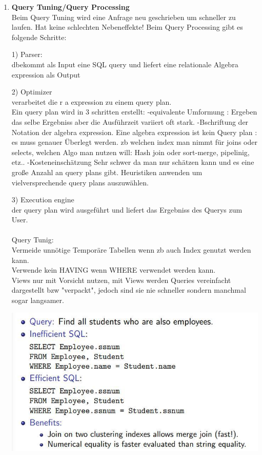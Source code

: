 \documentclass[12pt]{article}\pagestyle{myheadings}
\theoremstyle{plain}
\begin{document}
\begin{enumerate}
\item \textbf{Query Tuning/Query Processing} \\
Beim Query Tuning wird eine Anfrage neu geschrieben um schneller zu laufen.
Hat keine schlechten Nebeneffekte!
Beim Query Processing gibt es folgende Schritte:
\item[1)]Parser:\\
dbekommt als Input eine SQL query und liefert eine relationale Algebra expression als Output\\
\item[2)]Optimizer\\
verarbeitet die r a expression zu einem query plan.
\\
Ein query plan wird in 3 schritten erstellt:
-equivalente Umformung : Ergeben das selbe Ergebniss aber die Ausführzeit variiert oft stark.
-Bschriftung der Notation der algebra expression. Eine algebra expression ist kein Query plan : es muss genauer Überlegt werden. zb welchen index man nimmt für joins oder selects, welchen Algo man nutzen will: Hash join oder sort-merge, pipelinig, etz..
-Kosteneinschätzung
Sehr schwer da man nur schätzen kann und es eine große Anzahl an query plans gibt.
Heuristiken anwenden um vielversprechende query plans auszuwählen.\\
\item[3)]Execution engine\\
der query plan wird ausgeführt und liefert das Ergebniss des Querys zum User.\\ \\
\newpage
Query Tunig:\\
Vermeide unnötige Temporäre Tabellen wenn zb auch Index genutzt werden kann.\\
Verwende kein HAVING wenn WHERE verwendet werden kann.\\
Views nur mit Vorsicht nutzen, mit Views werden Queries vereinfacht dargestellt bzw "verpackt", jedoch sind sie nie schneller sondern manchmal sogar langsamer.
\begin{center}
\includegraphics[scale=0.8]{query_tuning.jpg}
\end{center}


\end{enumerate}
\end{document}

